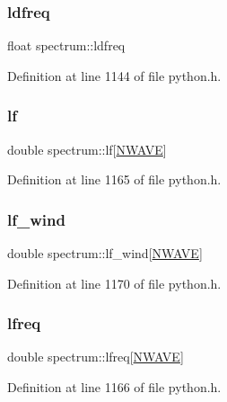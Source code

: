 \subsubsection{\texorpdfstring{ldfreq}{ldfreq}}
{\footnotesize\ttfamily float spectrum\+::ldfreq}



Definition at line 1144 of file python.\+h.

\mbox{\label{structspectrum_ae4378fec92cbe74ba06f0d5af8baf787}} 
\subsubsection{\texorpdfstring{lf}{lf}}
{\footnotesize\ttfamily double spectrum\+::lf\mbox{[}\hyperlink{python_8h_a466538c019bc48c22053d7807c5ac843}{N\+W\+A\+VE}\mbox{]}}



Definition at line 1165 of file python.\+h.

\mbox{\label{structspectrum_a43fdc92d4278b80d96cbe2ee62f10566}} 
\subsubsection{\texorpdfstring{lf\+\_\+wind}{lf\_wind}}
{\footnotesize\ttfamily double spectrum\+::lf\+\_\+wind\mbox{[}\hyperlink{python_8h_a466538c019bc48c22053d7807c5ac843}{N\+W\+A\+VE}\mbox{]}}



Definition at line 1170 of file python.\+h.

\mbox{\label{structspectrum_ad6b162a83a1e4fa4c5a8719bb50a91f5}} 
\subsubsection{\texorpdfstring{lfreq}{lfreq}}
{\footnotesize\ttfamily double spectrum\+::lfreq\mbox{[}\hyperlink{python_8h_a466538c019bc48c22053d7807c5ac843}{N\+W\+A\+VE}\mbox{]}}



Definition at line 1166 of file python.\+h.

